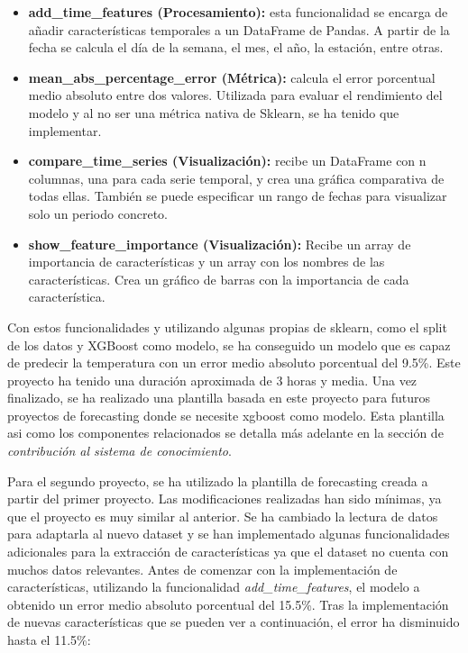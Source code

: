 \begin{itemize}
    \item \textbf{add\_time\_features (Procesamiento):} esta funcionalidad se encarga de añadir
    características temporales a un DataFrame de Pandas. A partir de la fecha se calcula
    el día de la semana, el mes, el año, la estación, entre otras.
    \item \textbf{mean\_abs\_percentage\_error (Métrica):} calcula el error porcentual medio
    absoluto entre dos valores. Utilizada para evaluar el rendimiento del modelo y al no
    ser una métrica nativa de Sklearn, se ha tenido que implementar.
    \item \textbf{compare\_time\_series (Visualización):} recibe un DataFrame con n columnas,
    una para cada serie temporal, y crea una gráfica comparativa de todas ellas. También
    se puede especificar un rango de fechas para visualizar solo un periodo concreto.
    \item \textbf{show\_feature\_importance (Visualización):} Recibe un array de importancia
    de características y un array con los nombres de las características. Crea un gráfico
    de barras con la importancia de cada característica.
\end{itemize}

Con estos funcionalidades y utilizando algunas propias de sklearn, como el split
de los datos y XGBoost como modelo, se ha conseguido un modelo que es capaz de predecir
la temperatura con un error medio absoluto porcentual del 9.5\%. Este proyecto ha tenido
una duración aproximada de 3 horas y media. Una vez finalizado, se ha realizado una
plantilla basada en este proyecto para futuros proyectos de forecasting donde se necesite
xgboost como modelo. Esta plantilla asi como los componentes relacionados se detalla más
adelante en la sección de \textit{contribución al sistema de conocimiento}.\medskip

Para el segundo proyecto, se ha utilizado la plantilla de forecasting creada
a partir del primer proyecto. Las modificaciones realizadas han sido mínimas,
ya que el proyecto es muy similar al anterior. Se ha cambiado la lectura de
datos para adaptarla al nuevo dataset y se han implementado algunas funcionalidades
adicionales para la extracción de características ya que el dataset no cuenta con
muchos datos relevantes. Antes de comenzar con la implementación de características,
utilizando la funcionalidad \textit{add\_time\_features}, el modelo a obtenido un error
medio absoluto porcentual del 15.5\%. Tras la implementación de nuevas características
que se pueden ver a continuación, el error ha disminuido hasta el 11.5\%:


